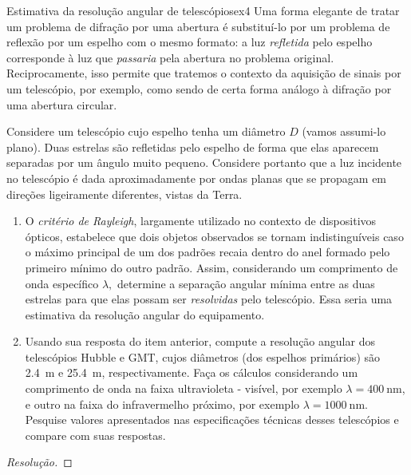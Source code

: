 \begin{exercício}{Estimativa da resolução angular de telescópios}{ex4}
    Uma forma elegante de tratar um problema de difração por uma abertura é substituí-lo por um problema de reflexão por um espelho com o mesmo formato: a luz \emph{refletida} pelo espelho corresponde à luz que \emph{passaria} pela abertura no problema original. Reciprocamente, isso permite que tratemos o contexto da aquisição de sinais por um telescópio, por exemplo, como sendo de certa forma análogo à difração por uma abertura circular.

    Considere um telescópio cujo espelho tenha um diâmetro \(D\) (vamos assumi-lo plano). Duas estrelas são refletidas pelo espelho de forma que elas aparecem separadas por um ângulo muito pequeno. Considere portanto que a luz incidente no telescópio é dada aproximadamente por ondas planas que se propagam em direções ligeiramente diferentes, vistas da Terra.
    \begin{enumerate}[label=(\alph*)]
        \item O \emph{critério de Rayleigh}, largamente utilizado no contexto de dispositivos ópticos, estabelece que dois objetos observados se tornam indistinguíveis caso o máximo principal de um dos padrões recaia dentro do anel formado pelo primeiro mínimo do outro padrão. Assim, considerando um comprimento de onda específico \(\lambda,\) determine a separação angular mínima entre as duas estrelas para que elas possam ser \emph{resolvidas} pelo telescópio. Essa seria uma estimativa da resolução angular do equipamento.
        \item Usando sua resposta do item anterior, compute a resolução angular dos telescópios Hubble e GMT, cujos diâmetros (dos espelhos primários) são \SI{2.4}{\meter} e \SI{25.4}{\meter}, respectivamente. Faça os cálculos considerando um comprimento de onda na faixa ultravioleta - visível, por exemplo \(\lambda = \SI{400}{\nano\meter}\), e outro na faixa do infravermelho próximo, por exemplo \(\lambda = \SI{1000}{\nano\meter}.\) Pesquise valores apresentados nas especificações técnicas desses telescópios e compare com suas respostas.
    \end{enumerate}
\end{exercício}
\begin{proof}[Resolução]
    
\end{proof}
